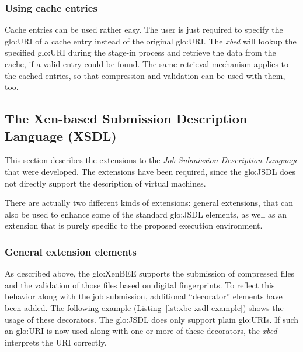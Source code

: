 \subsubsection{Using cache entries}

Cache  entries can  be used  rather  easy. The  user is  just required  to
specify  the  \gls{glo:URI} of  a  cache  entry  instead of  the  original
\gls{glo:URI}.   The \emph{xbed} will  lookup the  specified \gls{glo:URI}
during the  stage-in process and  retrieve the data  from the cache,  if a
valid entry  could be found. The  same retrieval mechanism  applies to the
cached entries, so that compression  and validation can be used with them,
too.


\subsection[The Xen-based Submission Description Language]{The Xen-based Submission Description Language (XSDL)}
\label{sec:xen-based-submission}

This  section  describes  the   extensions  to  the  \emph{Job  Submission
  Description  Language} that  were developed.   The extensions  have been
required,  since   the  \gls{glo:JSDL}  does  not   directly  support  the
description of virtual machines.

There are actually two  different kinds of extensions: general extensions,
that  can also  be used  to enhance  some of  the  standard \gls{glo:JSDL}
elements, as well as an extension  that is purely specific to the proposed
execution environment.

\subsubsection{General extension elements}

As  described  above,  the  \gls{glo:XenBEE} supports  the  submission  of
compressed  files and  the  validation  of those  files  based on  digital
fingerprints.   To reflect this  behavior along  with the  job submission,
additional ``decorator'' elements have  been added.  The following example
(Listing~\ref{lst:xbe-xsdl-example}) shows the  usage of these decorators.
The  \gls{glo:JSDL} does only  support plain  \gls{glo:URI}s.  If  such an
\gls{glo:URI} is now used along with  one or more of these decorators, the
\emph{xbed} interprets the URI correctly.

